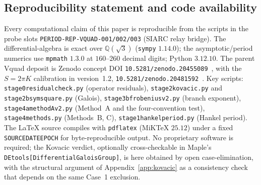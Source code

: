 \documentclass[11pt,reqno]{amsart}
\renewcommand{\_}{\vquadorigunderscore\allowbreak}
\theoremstyle{plain}
\theoremstyle{definition}
\newcommand{\Qsqrt}{\mathbb{Q}(\sqrt3)}
\begin{document}
\subsection{Reproducibility statement and code availability}\label{app:repro}
Every computational claim of this paper is reproducible from the scripts in the probe slots
\texttt{PERIOD-REP-VQUAD-001/002/003} (SIARC relay bridge). The differential-algebra is exact over
$\Qsqrt$ (\texttt{sympy} $1.14.0$); the asymptotic/period numerics use \texttt{mpmath} $1.3.0$ at
$160$--$260$ decimal digits; Python $3.12.10$. The parent V\_quad deposit is Zenodo concept DOI
\texttt{10.5281/zenodo.20455089}~\cite{Vquad}, with the $S=2\pi K$ calibration in version~1.2,
\texttt{10.5281/zenodo.20481592}~\cite{StokesNote}. Key scripts:
\texttt{stage0\_residual\_check.py} (operator residuals), \texttt{stage2\_kovacic.py} and
\texttt{stage2b\_symsquare.py} (Galois), \texttt{stage3b\_frobenius\_v2.py} (branch exponent),
\texttt{stage4a\_methodA\_v2.py} (Method~A and the four-convention test),
\texttt{stage4\_methods.py} (Methods~B, C), \texttt{stage1\_hankel\_period.py} (Hankel period).
The LaTeX source compiles with \texttt{pdflatex} (MiKTeX $25.12$) under a fixed
\texttt{SOURCE\_DATE\_EPOCH} for byte-reproducible output. No proprietary software is required;
the Kovacic verdict, optionally cross-checkable in Maple's
\texttt{DEtools[DifferentialGaloisGroup]}, is here obtained by open case-elimination, with the
structural argument of Appendix~\ref{app:kovacic} as a consistency check that depends on the
same Case~1 exclusion.
\end{document}
